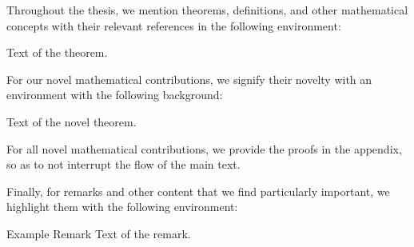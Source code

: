 Throughout the thesis, we mention theorems, definitions, and other mathematical concepts with their relevant references in the following environment:
\begin{theorem}
Text of the theorem.
\end{theorem}

For our novel mathematical contributions, we signify their novelty with an environment with the following background:
\begin{selftheorem}
Text of the novel theorem.
\end{selftheorem}
For all novel mathematical contributions, we provide the proofs in the appendix, so as to not interrupt the flow of the main text. 

Finally, for remarks and other content that we find particularly important, we highlight them with the following environment:
\begin{lightgraybox}{Example Remark}
Text of the remark.
\end{lightgraybox}





